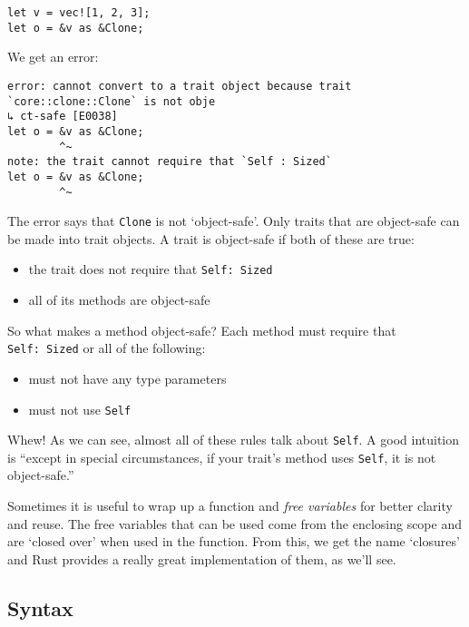\documentclass[a4paper,]{book}
\begin{document}
\begin{verbatim}
let v = vec![1, 2, 3];
let o = &v as &Clone;
\end{verbatim}

We get an error:

\begin{verbatim}
error: cannot convert to a trait object because trait `core::clone::Clone` is not obje
↳ ct-safe [E0038]
let o = &v as &Clone;
        ^~
note: the trait cannot require that `Self : Sized`
let o = &v as &Clone;
        ^~
\end{verbatim}

The error says that \texttt{Clone} is not `object-safe'. Only traits
that are object-safe can be made into trait objects. A trait is
object-safe if both of these are true:

\begin{itemize}
\itemsep1pt\parskip0pt
\item
  the trait does not require that \texttt{Self:\ Sized}
\item
  all of its methods are object-safe
\end{itemize}

So what makes a method object-safe? Each method must require that
\texttt{Self:\ Sized} or all of the following:

\begin{itemize}
\itemsep1pt\parskip0pt
\item
  must not have any type parameters
\item
  must not use \texttt{Self}
\end{itemize}

Whew! As we can see, almost all of these rules talk about \texttt{Self}.
A good intuition is ``except in special circumstances, if your trait's
method uses \texttt{Self}, it is not object-safe.''


Sometimes it is useful to wrap up a function and \emph{free variables}
for better clarity and reuse. The free variables that can be used come
from the enclosing scope and are `closed over' when used in the
function. From this, we get the name `closures' and Rust provides a
really great implementation of them, as we'll see.

\subsection{Syntax}\label{syntax}
\end{document}
